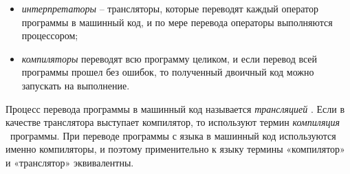 \begin{itemize}
\item {}\textit{интерпретатор}\textit{ы}%
\textit{ }– трансляторы, которые переводят каждый оператор программы в машинный код, и по мере перевода операторы
выполняются процессором; 
\item {}\textit{компилятор}\textit{ы}%
%
 переводят всю программу целиком, и если перевод всей программы прошел без ошибок, то полученный двоичный код можно
запускать на выполнение. 
\end{itemize}
Процесс перевода программы в машинный код называется \textit{трансляцией}%
%
. Если в качестве транслятора выступает компилятор, то используют термин \textit{компиляция}%
%
~программы. При переводе программы с языка  в машинный код используются именно компиляторы, и поэтому применительно к
языку  термины «компилятор» и «транслятор» эквивалентны.

